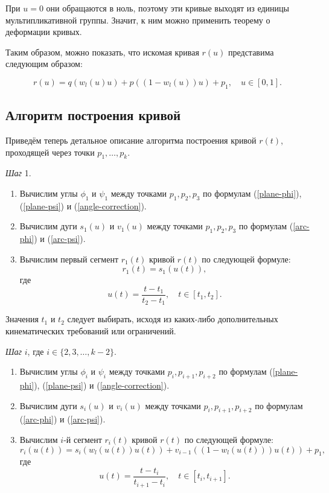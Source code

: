 При $u=0$ они обращаются в ноль, поэтому эти кривые выходят из единицы мультипликативной группы. Значит, к ним можно
применить теорему о деформации кривых.

Таким образом, можно показать, что искомая кривая $r(u)$ представима следующим образом:

$$
r(u)=q(w_l(u)u)+p((1-w_l(u))u)+p_1, \quad u \in [0,1].
$$

\subsection*{Алгоритм построения кривой}

Приведём теперь детальное описание алгоритма построения кривой $r(t)$, проходящей через точки $p_1,\dots,p_k$.

\bigskip
\textit{Шаг} 1.

\begin{enumerate}
\item Вычислим углы $\phi_1$ и $\psi_1$ между точками $p_1,p_2,p_3$ по формулам (\ref{plane-phi}), (\ref{plane-psi}) и
(\ref{angle-correction}).
\item Вычислим дуги $s_1(u)$ и $v_1(u)$ между точками $p_1,p_2,p_3$ по формулам (\ref{arc-phi}) и (\ref{arc-psi}).
\item Вычислим первый сегмент $r_1(t)$ кривой $r(t)$ по следующей формуле:
$$
r_1(t)=s_1(u(t)),
$$
\noindent где
$$
u(t)=\frac{t-t_1}{t_2-t_1}, \quad t \in [t_1,t_2].
$$
\end{enumerate}

Значения $t_1$ и $t_2$ следует выбирать, исходя из каких-либо дополнительных кинематических требований или ограничений.

\bigskip
\textit{Шаг} $i$, где $i \in \{2,3,\dots,k-2\}$.

\begin{enumerate}
\item Вычислим углы $\phi_i$ и $\psi_i$ между точками $p_i,p_{i+1},p_{i+2}$ по формулам (\ref{plane-phi}),
(\ref{plane-psi}) и (\ref{angle-correction}).
\item Вычислим дуги $s_i(u)$ и $v_i(u)$ между точками $p_i,p_{i+1},p_{i+2}$ по формулам (\ref{arc-phi}) и
(\ref{arc-psi}).
\item Вычислим $i$-й сегмент $r_i(t)$ кривой $r(t)$ по следующей формуле:
$$
r_i(u(t))=s_i(w_l(u(t))u(t))+v_{i-1}((1-w_l(u(t)))u(t))+p_1,
$$
\noindent где
$$
u(t)=\frac{t-t_i}{t_{i+1}-t_i}, \quad t \in [t_i,t_{i+1}].
$$
\end{enumerate}


